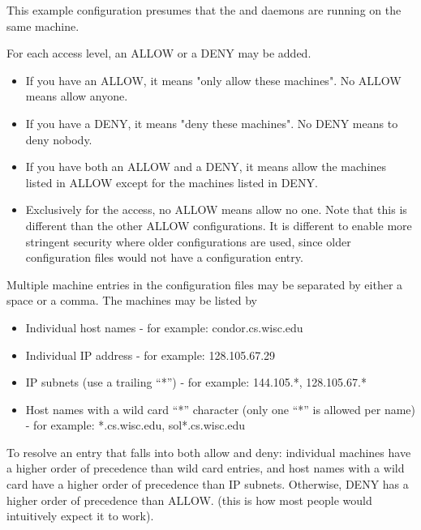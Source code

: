 This example configuration presumes that the 
and  daemons are running on the same machine.

For each access level, an ALLOW or a DENY may be added.
\begin{itemize}

\item If you have an ALLOW, it means "only allow these machines".  No
    ALLOW means allow anyone.

\item If you have a DENY, it means "deny these machines".  No DENY
    means to deny nobody.

\item If you have both an ALLOW and a DENY, it means allow the
    machines listed in ALLOW except for the machines listed in DENY.

\item Exclusively for the  access,
    no ALLOW means allow no one.
    Note that this is different than the other ALLOW configurations.
    It is different to enable more stringent security where
    older configurations are used, since
    older configuration files would not have a 
     configuration entry.
\end{itemize}

Multiple machine entries
in the configuration files
may be separated by either a space or a comma.
The machines may be listed by

\begin{itemize}
\item Individual host names - for example: condor.cs.wisc.edu
\item Individual IP address - for example: 128.105.67.29
\item IP subnets (use a trailing ``*'') - for example: 144.105.*, 128.105.67.*
\item Host names with a wild card ``*'' character (only one ``*'' is
    allowed per name) - for example: *.cs.wisc.edu, sol*.cs.wisc.edu
\end{itemize}

To resolve an entry that falls into both allow and deny:
individual
machines have a higher order of precedence than wild card entries, and
host names with a wild card have a higher order of precedence than IP
subnets.
Otherwise, DENY has a higher order of precedence than ALLOW.
(this is how most people would intuitively expect it to work).  

